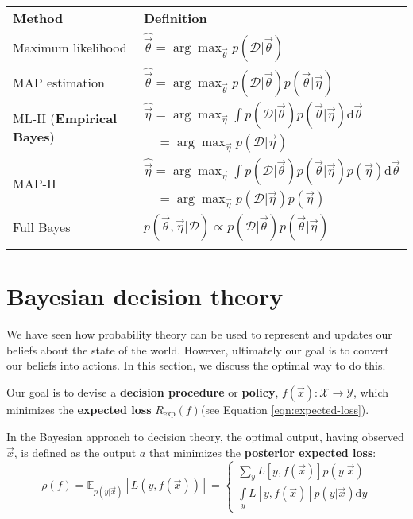 \begin{table}
\normalsize	
\centering
\begin{tabular}{ll}
\hline\noalign{\smallskip}
\textbf{Method} & \textbf{Definition} \\
\noalign{\smallskip}\svhline\noalign{\smallskip}
Maximum likelihood & $\hat{\vec{\theta}}=\arg\max_{\vec{\theta}} p(\mathcal{D}|\vec{\theta})$ \\
MAP estimation & $\hat{\vec{\theta}}=\arg\max_{\vec{\theta}} p(\mathcal{D}|\vec{\theta})p(\vec{\theta}|\vec{\eta})$ \\
\multirow{2}{*}{ML-II (\textbf{Empirical Bayes})} & $\hat{\vec{\eta}}=\arg\max_{\vec{\eta}} \int p(\mathcal{D}|\vec{\theta})p(\vec{\theta}|\vec{\eta})\mathrm{d}\vec{\theta}$ \\
                                                  & $\quad =\arg\max_{\vec{\eta}}p(\mathcal{D}|\vec{\eta})$ \\
\multirow{2}{*}{MAP-II} & $\hat{\vec{\eta}}=\arg\max_{\vec{\eta}} \int p(\mathcal{D}|\vec{\theta})p(\vec{\theta}|\vec{\eta})p(\vec{\eta})\mathrm{d}\vec{\theta}$ \\
                        & $\quad =\arg\max_{\vec{\eta}}p(\mathcal{D}|\vec{\eta})p(\vec{\eta})$ \\
Full Bayes & $p(\vec{\theta},\vec{\eta}|\mathcal{D}) \propto p(\mathcal{D}|\vec{\theta})p(\vec{\theta}|\vec{\eta})$ \\
\noalign{\smallskip}\hline
\end{tabular}
\end{table}


\section{Bayesian decision theory}
\label{sec:Bayesian-decision-theory}
We have seen how probability theory can be used to represent and updates our beliefs about the state of the world. However, ultimately our goal is to convert our beliefs into actions. In this section, we discuss the optimal way to do this.

Our goal is to devise a \textbf{decision procedure} or \textbf{policy}, $f(\vec{x}) : \mathcal{X} \rightarrow \mathcal{Y}$, which minimizes the \textbf{expected loss} $R_{\mathrm{exp}}(f)$(see Equation \ref{eqn:expected-loss}).

In the Bayesian approach to decision theory, the optimal output, having observed $\vec{x}$, is defined as the output $a$ that minimizes the \textbf{posterior expected loss}:
\begin{equation}
\rho(f)=\mathbb{E}_{p(y|\vec{x})}[L(y,f(\vec{x}))]=\begin{cases}
\sum\limits_y L[y,f(\vec{x})]p(y|\vec{x}) \\
\int\limits_y L[y,f(\vec{x})]p(y|\vec{x})\mathrm{d}y
\end{cases}
\end{equation}

